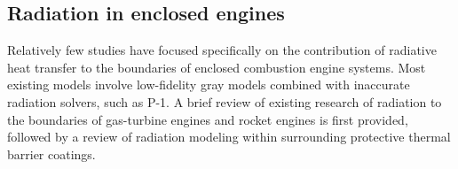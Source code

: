 







\subsection{Radiation in enclosed engines}
Relatively few studies have focused specifically on the contribution of radiative heat transfer to the boundaries of enclosed combustion engine systems. Most existing models involve low-fidelity gray models combined with inaccurate radiation solvers, such as P-1. A brief review of existing research of radiation to the boundaries of gas-turbine engines and rocket engines is first provided, followed by a review of radiation modeling within surrounding protective thermal barrier coatings.


